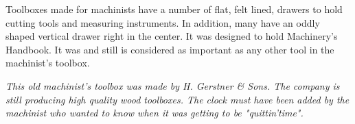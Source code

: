 \begin{framed}

 
Toolboxes made for machinists have a number of flat, felt lined, drawers to hold
cutting tools and measuring instruments. In addition, many have an oddly shaped
vertical drawer right in the center. It was designed to hold Machinery's
Handbook. It was and still is considered as important as any other tool in the
machinist's toolbox.

\bigskip\textit{This old machinist's toolbox was made by H. Gerstner \& Sons.
The company is still producing high quality wood toolboxes. The clock must have
been added by the machinist who wanted to know when it was getting to be
"quittin'time".}

\end{framed}

\secup
